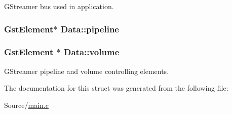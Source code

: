 G\+Streamer bus used in application. 

\subsubsection[{\texorpdfstring{pipeline}{pipeline}}]{\setlength{\rightskip}{0pt plus 5cm}Gst\+Element$\ast$ Data\+::pipeline}\hypertarget{structData_acc9420301b7625de16e13eefa553fc87}{}\label{structData_acc9420301b7625de16e13eefa553fc87}
\subsubsection[{\texorpdfstring{volume}{volume}}]{\setlength{\rightskip}{0pt plus 5cm}Gst\+Element $\ast$ Data\+::volume}\hypertarget{structData_a6981e07718f31f6b5485075187f41e93}{}\label{structData_a6981e07718f31f6b5485075187f41e93}


G\+Streamer pipeline and volume controlling elements. 



The documentation for this struct was generated from the following file\+:\begin{DoxyCompactItemize}
\item 
Source/\hyperlink{main_8c}{main.\+c}\end{DoxyCompactItemize}
